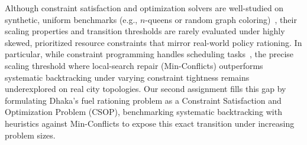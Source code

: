 \documentclass{ai-lab-report}
\begin{document}
Although constraint satisfaction and optimization solvers are well-studied on synthetic, uniform benchmarks (e.g., $n$-queens or random graph coloring)~\citep{dechter2003constraint,kumar1992algorithms}, their scaling properties and transition thresholds are rarely evaluated under highly skewed, prioritized resource constraints that mirror real-world policy rationing. In particular, while constraint programming handles scheduling tasks~\citep{bartak1999constraint}, the precise scaling threshold where local-search repair (Min-Conflicts) outperforms systematic backtracking under varying constraint tightness remains underexplored on real city topologies. Our second assignment fills this gap by formulating Dhaka's fuel rationing problem as a Constraint Satisfaction and Optimization Problem (CSOP), benchmarking systematic backtracking with heuristics against Min-Conflicts to expose this exact transition under increasing problem sizes.
\end{document}

